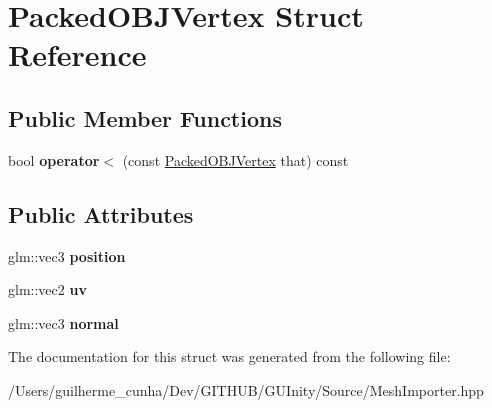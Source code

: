 \hypertarget{struct_packed_o_b_j_vertex}{}\section{Packed\+O\+B\+J\+Vertex Struct Reference}
\label{struct_packed_o_b_j_vertex}
\subsection*{Public Member Functions}
\begin{DoxyCompactItemize}
\item 
\hypertarget{struct_packed_o_b_j_vertex_a66d540de278b1bd89d0e386ac9141124}{}bool {\bfseries operator$<$} (const \hyperlink{struct_packed_o_b_j_vertex}{Packed\+O\+B\+J\+Vertex} that) const \label{struct_packed_o_b_j_vertex_a66d540de278b1bd89d0e386ac9141124}

\end{DoxyCompactItemize}
\subsection*{Public Attributes}
\begin{DoxyCompactItemize}
\item 
\hypertarget{struct_packed_o_b_j_vertex_a6a6dcdb4fa928144595b922fc4f05269}{}glm\+::vec3 {\bfseries position}\label{struct_packed_o_b_j_vertex_a6a6dcdb4fa928144595b922fc4f05269}

\item 
\hypertarget{struct_packed_o_b_j_vertex_a2aa0bcdf0686313becf6de277ab7c47a}{}glm\+::vec2 {\bfseries uv}\label{struct_packed_o_b_j_vertex_a2aa0bcdf0686313becf6de277ab7c47a}

\item 
\hypertarget{struct_packed_o_b_j_vertex_a3c6529f9a8518a5a807241438f70a24f}{}glm\+::vec3 {\bfseries normal}\label{struct_packed_o_b_j_vertex_a3c6529f9a8518a5a807241438f70a24f}

\end{DoxyCompactItemize}


The documentation for this struct was generated from the following file\+:\begin{DoxyCompactItemize}
\item 
/\+Users/guilherme\+\_\+cunha/\+Dev/\+G\+I\+T\+H\+U\+B/\+G\+U\+Inity/\+Source/Mesh\+Importer.\+hpp\end{DoxyCompactItemize}
